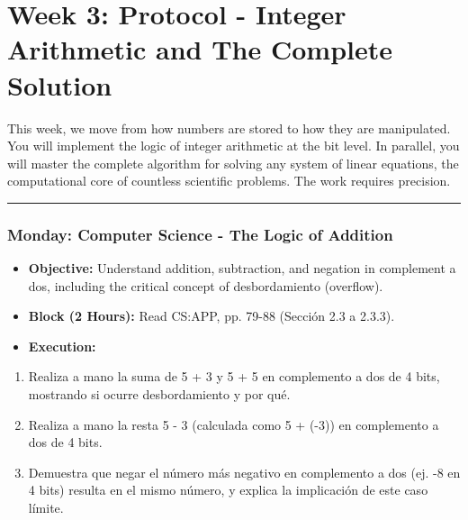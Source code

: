 \section{Week 3: Protocol - Integer Arithmetic and The Complete Solution}

This week, we move from how numbers are stored to how they are manipulated. You will implement the logic of integer arithmetic at the bit level. In parallel, you will master the complete algorithm for solving any system of linear equations, the computational core of countless scientific problems. The work requires precision.

\noindent\rule{\textwidth}{0.4pt}

\subsubsection{\textbf{Monday: Computer Science - The Logic of Addition}}
\begin{itemize}
  \item \textbf{Objective:} Understand addition, subtraction, and negation in complement a dos, including the critical concept of desbordamiento (overflow).
  \item \textbf{Block (2 Hours):} Read CS:APP, pp. 79-88 (Sección 2.3 a 2.3.3).
  \item \textbf{Execution:}
\end{itemize}
\begin{enumerate}
  \item Realiza a mano la suma de 5 + 3 y 5 + 5 en complemento a dos de 4 bits, mostrando si ocurre desbordamiento y por qué.
  \item Realiza a mano la resta 5 - 3 (calculada como 5 + (-3)) en complemento a dos de 4 bits.
  \item Demuestra que negar el número más negativo en complemento a dos (ej. -8 en 4 bits) resulta en el mismo número, y explica la implicación de este caso límite.

\end{enumerate}
